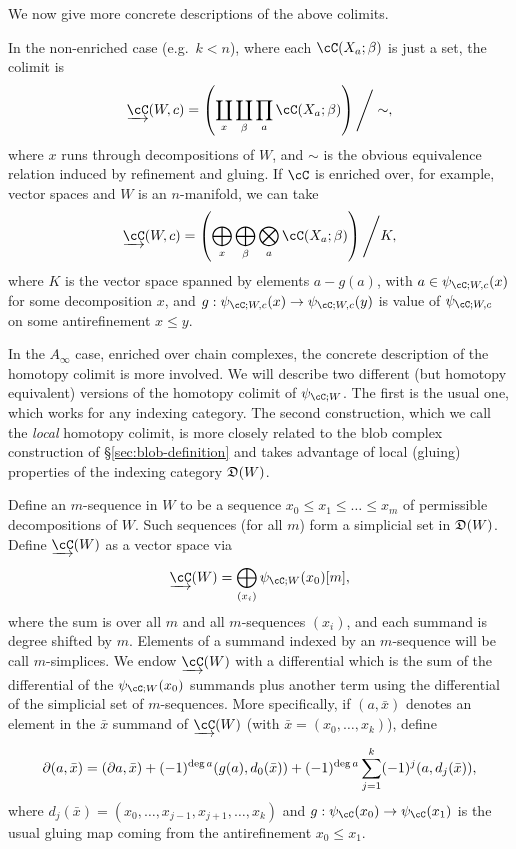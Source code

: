 \medskip

We now give more concrete descriptions of the above colimits.

In the non-enriched case (e.g.\ $k<n$), where each $\cC(X_a; \beta)$ is just a set,
the colimit is
\[
	\cl{\cC}(W,c) = \left( \coprod_x \coprod_\beta \prod_a \cC(X_a; \beta) \right) \Bigg/ \sim ,
\]
where $x$ runs through decompositions of $W$, and $\sim$ is the obvious equivalence relation 
induced by refinement and gluing.
If $\cC$ is enriched over, for example, vector spaces and $W$ is an $n$-manifold, 
we can take
\begin{equation*}
	\cl{\cC}(W,c) = \left( \bigoplus_x \bigoplus_\beta \bigotimes_a \cC(X_a; \beta) \right) \Bigg/ K,
\end{equation*}
where $K$ is the vector space spanned by elements $a - g(a)$, with
$a\in \psi_{\cC;W,c}(x)$ for some decomposition $x$, and $g: \psi_{\cC;W,c}(x)
\to \psi_{\cC;W,c}(y)$ is value of $\psi_{\cC;W,c}$ on some antirefinement $x \leq y$.

In the $A_\infty$ case, enriched over chain complexes, the concrete description of the homotopy colimit
is more involved.
We will describe two different (but homotopy equivalent) versions of the homotopy colimit of $\psi_{\cC;W}$.
The first is the usual one, which works for any indexing category.
The second construction, which we call the {\it local} homotopy colimit,
is more closely related to the blob complex
construction of \S \ref{sec:blob-definition} and takes advantage of local (gluing) properties
of the indexing category $\mathfrak{D}(W)$.

Define an $m$-sequence in $W$ to be a sequence $x_0 \le x_1 \le \dots \le x_m$ of permissible decompositions of $W$.
Such sequences (for all $m$) form a simplicial set in $\mathfrak{D}(W)$.
Define $\cl{\cC}(W)$ as a vector space via
\[
	\cl{\cC}(W) = \bigoplus_{(x_i)} \psi_{\cC;W}(x_0)[m] ,
\]
where the sum is over all $m$ and all $m$-sequences $(x_i)$, and each summand is degree shifted by $m$. 
Elements of a summand indexed by an $m$-sequence will be call $m$-simplices.
We endow $\cl{\cC}(W)$ with a differential which is the sum of the differential of the $\psi_{\cC;W}(x_0)$
summands plus another term using the differential of the simplicial set of $m$-sequences.
More specifically, if $(a, \bar{x})$ denotes an element in the $\bar{x}$
summand of $\cl{\cC}(W)$ (with $\bar{x} = (x_0,\dots,x_k)$), define
\[
	\partial (a, \bar{x}) = (\partial a, \bar{x}) + (-1)^{\deg{a}} (g(a), d_0(\bar{x})) + (-1)^{\deg{a}} \sum_{j=1}^k (-1)^{j} (a, d_j(\bar{x})) ,
\]
where $d_j(\bar{x}) = (x_0,\dots,x_{j-1},x_{j+1},\dots,x_k)$ and $g: \psi_\cC(x_0)\to \psi_\cC(x_1)$
is the usual gluing map coming from the antirefinement $x_0 \le x_1$.


